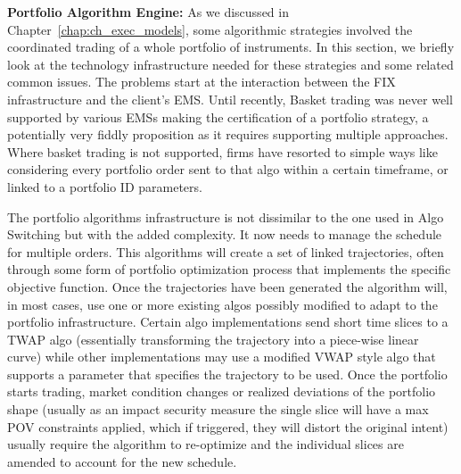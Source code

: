 \noindent\textbf{Portfolio Algorithm Engine:} As we discussed in Chapter~\ref{chap:ch_exec_models}, some algorithmic strategies involved the coordinated trading of a whole portfolio of instruments. In this section, we briefly look at the technology infrastructure needed for these strategies and some related common issues. The problems start at the interaction between the FIX infrastructure and the client's EMS. Until recently, Basket trading was  never well supported by various EMSs making the certification of a portfolio strategy, a potentially very fiddly proposition as it requires supporting multiple approaches. Where basket trading is not supported, firms have resorted to simple ways like considering every portfolio order sent to that algo within a certain timeframe, or linked to a portfolio ID parameters. 


The portfolio algorithms infrastructure is not dissimilar to the one used in Algo Switching but with the added complexity. It now needs to manage the schedule for multiple orders. This algorithms will create a set of linked trajectories, often through some form of portfolio optimization process that implements the specific objective function. Once the trajectories have been generated the algorithm will, in most cases, use one or more existing  algos possibly modified to adapt to the portfolio infrastructure.  Certain algo implementations send short time slices to a TWAP algo (essentially transforming the trajectory into a piece-wise linear curve) while other implementations may use a modified VWAP style algo that supports a parameter that specifies the trajectory to be used. Once the portfolio starts trading, market condition changes or realized deviations of the portfolio shape (usually as an impact security measure the single slice will have a max POV constraints applied, which if triggered, they will distort the original intent) usually require the algorithm to re-optimize and the individual slices are amended to account for the new schedule.


